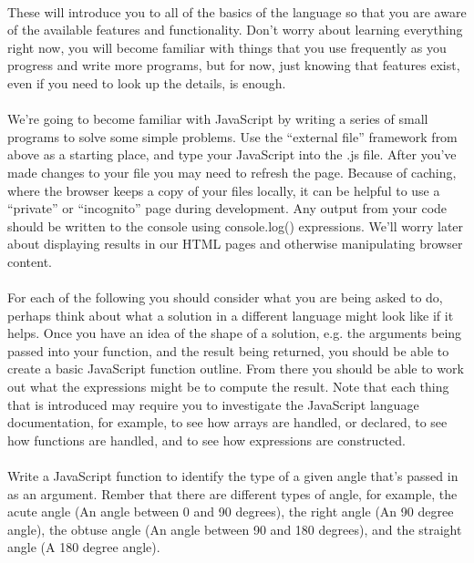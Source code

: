 \documentclass[10pt, a4paper, twosize]{article}
\begin{document}
\paragraph{} These will introduce you to all of the basics of the language so that you are aware of the available features and functionality. Don't worry about learning everything right now, you will become familiar with things that you use frequently as you progress and write more programs, but for now, just knowing that features exist, even if you need to look up the details, is enough.


\paragraph{} We're going to become familiar with JavaScript by writing a series of small programs to solve some simple problems. Use the ``external file'' framework from above as a starting place, and type your JavaScript into the .js file. After you've made changes to your file you may need to refresh the page. Because of caching, where the browser keeps a copy of your files locally, it can be helpful to use a ``private'' or ``incognito'' page during development. Any output from your code should be written to the console using console.log() expressions. We'll worry later about displaying results in our HTML pages and otherwise manipulating browser content.

\paragraph{} For each of the following you should consider what you are being asked to do, perhaps think about what a solution in a different language might look like if it helps. Once you have an idea of the shape of a solution, e.g. the arguments being passed into your function, and the result being returned, you should be able to create a basic JavaScript function outline. From there you should be able to work out what the expressions might be to compute the result. Note that each thing that is introduced may require you to investigate the JavaScript language documentation, for example, to see how arrays are handled, or declared, to see how functions are handled, and to see how expressions are constructed.

\paragraph{} Write a JavaScript function to identify the type of a given angle that's passed in as an argument. Rember that there are different types of angle, for example, the acute angle (An angle between 0 and 90 degrees), the right angle (An 90 degree angle), the obtuse angle (An angle between 90 and 180 degrees), and the straight angle (A 180 degree angle).
\end{document}
